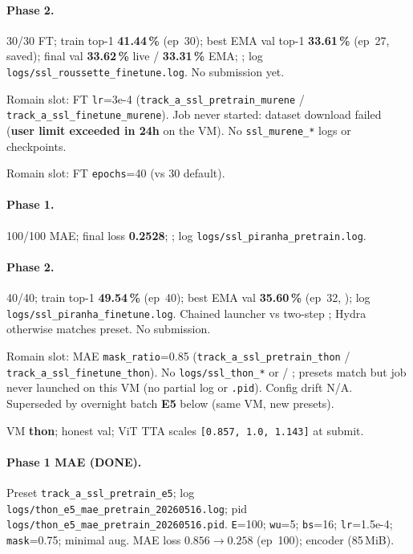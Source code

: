 \begin{table}[ht]
\begin{minipage}{\linewidth}
\begin{description}[leftmargin=1.5em, style=nextline]
  \paragraph{Phase 2.} 30/30 FT; train top-1 \textbf{41.44\,\%} (ep~30);
  best EMA val top-1 \textbf{33.61\,\%} (ep~27, saved);
  final val \textbf{33.62\,\%} live / \textbf{33.31\,\%} EMA;
  ; log \texttt{logs/ssl\_roussette\_finetune.log}.
  No submission yet.
\item[\textbf{SSL slot 16 / murene} (NOT RUN --- dataset quota)]
  Romain slot: FT \texttt{lr}=3e-4
  (\texttt{track\_a\_ssl\_pretrain\_murene} /
  \texttt{track\_a\_ssl\_finetune\_murene}).  Job never started: dataset
  download failed (\textbf{user limit exceeded in 24h} on the VM).  No
  \texttt{ssl\_murene\_*} logs or checkpoints.
\item[\textbf{SSL slot 15 / piranha} (DONE)]
  Romain slot: FT \texttt{epochs}=40 (vs 30 default).
  \paragraph{Phase 1.} 100/100 MAE; final loss \textbf{0.2528};
  ; log \texttt{logs/ssl\_piranha\_pretrain.log}.
  \paragraph{Phase 2.} 40/40; train top-1 \textbf{49.54\,\%} (ep~40);
  best EMA val \textbf{35.60\,\%} (ep~32, );
  log \texttt{logs/ssl\_piranha\_finetune.log}.  Chained launcher vs
  two-step ; Hydra otherwise matches preset.  No submission.
\item[\textbf{SSL slot 14 / thon} (NOT RUN --- this host)]
  Romain slot: MAE \texttt{mask\_ratio}=0.85
  (\texttt{track\_a\_ssl\_pretrain\_thon} /
  \texttt{track\_a\_ssl\_finetune\_thon}).  No
  \texttt{logs/ssl\_thon\_*} or  /
  ; presets match  but job never
  launched on this VM (no partial log or \texttt{.pid}).  Config drift N/A.
  Superseded by overnight batch \textbf{E5} below (same VM, new presets).
\item[\textbf{E5 / thon batch} (OVERNIGHT 20260516)]
  VM \textbf{thon}; honest val; ViT TTA scales
  \texttt{[0.857, 1.0, 1.143]} at submit.
  \paragraph{Phase 1 MAE (DONE).}
  Preset \texttt{track\_a\_ssl\_pretrain\_e5};
  log \texttt{logs/thon\_e5\_mae\_pretrain\_20260516.log};
  pid \texttt{logs/thon\_e5\_mae\_pretrain\_20260516.pid}.
  \texttt{E}=100; \texttt{wu}=5; \texttt{bs}=16; \texttt{lr}=1.5e-4;
  \texttt{mask}=0.75; minimal aug.  MAE loss \(0.856 \to 0.258\) (ep~100);
  encoder  (85\,MiB).

\end{description}
\end{minipage}
\end{table}

